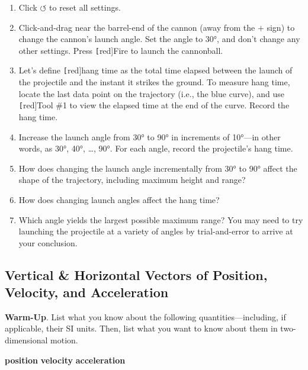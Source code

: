 \documentclass[main-physics.tex]{subfiles}
\begin{document}
\begin{enumerate}
    \item Click $\boldsymbol{\circlearrowleft}$ to reset all settings.
    \item Click-and-drag near the barrel-end of the cannon (away from the $\boldsymbol{+}$ sign) to change the cannon's launch angle. Set the angle to \ang{30}, and don't change any other settings. Press \texttt[red]{Fire} to launch the cannonball. 
    \item Let's define \texttt[red]{hang time} as the total time elapsed between the launch of the projectile and the instant it strikes the ground. To measure hang time, locate the last data point on the trajectory (i.e., the blue curve), and use \texttt[red]{Tool \#1} to view the elapsed time at the end of the curve. Record the hang time.
    \item Increase the launch angle from \ang{30} to \ang{90} in increments of \ang{10}---in other words, as \ang{30}, \ang{40}, \ldots, \ang{90}. For each angle, record the projectile's hang time.
    \item How does changing the launch angle incrementally from \ang{30} to \ang{90} affect the shape of the trajectory, including maximum height and range?
    \item How does changing launch angles affect the hang time?  
    \item Which angle yields the largest possible maximum range? You may need to try launching the projectile at a variety of angles by trial-and-error to arrive at your conclusion.
\end{enumerate}

\subsection{Vertical \& Horizontal Vectors of Position, Velocity, and Acceleration} \label{tMF7JY}

\begin{mdframed}[backgroundcolor=csOrange]
    \textbf{Warm-Up}. List what you know about the following quantities---including, if applicable, their SI units. Then, list what you want to know about them in two-dimensional motion.

    \begin{center}
        \textbf{position} \hspace{2em}
        \textbf{velocity} \hspace{2em}
        \textbf{acceleration}
    \end{center}
\end{mdframed}
\end{document}
